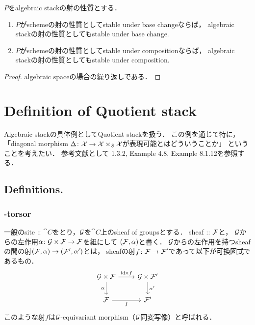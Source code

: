 \begin{Lemma}[\rep]
        $P$をalgebraic stackの射の性質とする．
\begin{enumerate}
    \item
        $P$がschemeの射の性質としてstable under base changeならば，
        algebraic stackの射の性質としてもstable under base change.
    \item
        $P$がschemeの射の性質としてstable under compositionならば，
        algebraic stackの射の性質としてもstable under composition.
\end{enumerate}
\end{Lemma}
\begin{proof}
    algebraic spaceの場合の繰り返しである．
\end{proof}

\section{Definition of Quotient stack}
    Algebraic stackの具体例としてQuotient stackを扱う．
    この例を通じて特に，
    「diagonal morphism $\Delta \colon \mathcal{X} \to \mathcal{X} \times_S \mathcal{X}$が表現可能とはどういうことか」
    ということを考えたい．
    参考文献として\cite{LMB} 1.3.2, \cite{DM69} Example 4.8, \cite{Olsson16} Example 8.1.12を参照する．

\subsection{Definitions.}
    \subsubsection{-torsor}
    \begin{Def}
        一般のsite :: $\cat{C}$をとり，$\mathcal{G}$を$\cat{C}$上のsheaf of groupsとする．
        sheaf :: $\mathcal{F}$と，
        $\mathcal{G}$からの左作用$\alpha \colon \mathcal{G} \times \mathcal{F} \to \mathcal{F}$を組にして
        $(\mathcal{F}, \alpha)$と書く．
        $\mathcal{G}$からの左作用を持つsheafの間の射$(\mathcal{F}, \alpha) \to (\mathcal{F}', \alpha')$とは，
        sheafの射$f \colon \mathcal{F} \to \mathcal{F}'$であって以下が可換図式であるもの．
        \[
            \begin{tikzcd}
                \shG \times \shF \ar[r, "\id \times f"]\ar[d, "\alpha"']& \shG \times \shF' \ar[d, "\alpha'"]\\
                \shF \ar[r, "f"']& \shF'
            \end{tikzcd}
        \]
        このような射$f$は$\mathcal{G}$-equivariant morphism（$\mathcal{G}$同変写像）と呼ばれる．
    \end{Def}

